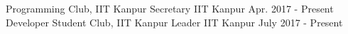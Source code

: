 \vspace{-0.3cm}


\begin{cventries}

  \extraentry
  {Programming Club, IIT Kanpur}
  {Secretary}
  {IIT Kanpur}
  {Apr. 2017 - Present}
  {
  }
  \vspace{-0.3cm}
  \extraentry
  {Developer Student Club, IIT Kanpur}
  {Leader}
  {IIT Kanpur}
  {July 2017 - Present}
  {
  }
  \vspace{-0.3cm}

\end{cventries}
